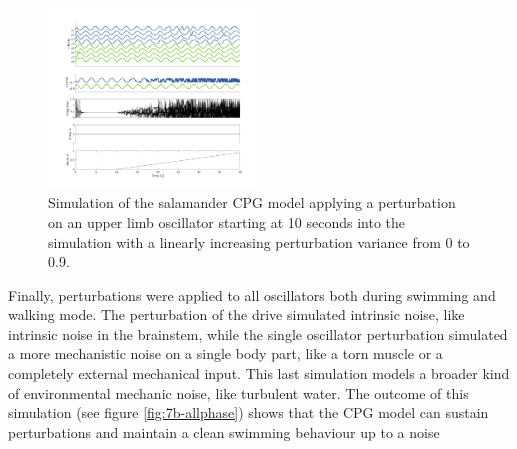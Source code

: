 \documentclass[a4paper]{scrartcl}
\begin{document}
{\begin{figure}[h]
	\includegraphics[width=0.5\textwidth]{fig/figure7b_limbphase.png}
	\caption{Simulation of the salamander CPG model applying a perturbation on an upper limb oscillator starting at 10 seconds into the simulation with a linearly increasing perturbation variance from 0 to 0.9.}
	\label{fig:7b-limbphase}
\end{figure}

Finally, perturbations were applied to all oscillators both during swimming and walking mode. The perturbation of the drive simulated intrinsic noise, like intrinsic noise in the brainstem, while the single oscillator perturbation simulated a more mechanistic noise on a single body part, like a torn muscle or a completely external mechanical input. This last simulation models a broader kind of environmental mechanic noise, like turbulent water. The outcome of this simulation (see figure \ref{fig:7b-allphase}) shows that the CPG model can sustain perturbations and maintain a clean swimming behaviour up to a noise

}
\end{document}
